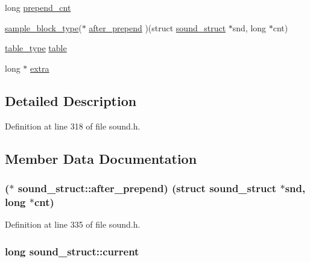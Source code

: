 \begin{DoxyCompactItemize}
long \hyperlink{structsound__struct_a253c4a0814605d956f3fccb616ccbe90}{prepend\+\_\+cnt}
\item 
\hyperlink{sound_8h_a6becaef7eb98c0e45b13f72dadf07b23}{sample\+\_\+block\+\_\+type}($\ast$ \hyperlink{structsound__struct_a9c04a2fe9d615fe258d8db15e04adc42}{after\+\_\+prepend} )(struct \hyperlink{structsound__struct}{sound\+\_\+struct} $\ast$snd, long $\ast$cnt)
\item 
\hyperlink{sound_8h_a187b856587310160cfd8b383e7377171}{table\+\_\+type} \hyperlink{structsound__struct_a2f2f797cf14f3038124f9db72182452e}{table}
\item 
long $\ast$ \hyperlink{structsound__struct_a932aa99e359ac71885ffa3426b2353cf}{extra}
\end{DoxyCompactItemize}


\subsection{Detailed Description}


Definition at line 318 of file sound.\+h.



\subsection{Member Data Documentation}
\subsubsection[{\texorpdfstring{after\+\_\+prepend}{after_prepend}}]{($\ast$ sound\+\_\+struct\+::after\+\_\+prepend) (struct {\bf sound\+\_\+struct} $\ast$snd, long $\ast$cnt)}\hypertarget{structsound__struct_a9c04a2fe9d615fe258d8db15e04adc42}{}\label{structsound__struct_a9c04a2fe9d615fe258d8db15e04adc42}


Definition at line 335 of file sound.\+h.

\subsubsection[{\texorpdfstring{current}{current}}]{\setlength{\rightskip}{0pt plus 5cm}long sound\+\_\+struct\+::current}\hypertarget{structsound__struct_a36de08aa7f68cf01c3f197548bc3e00f}{}\label{structsound__struct_a36de08aa7f68cf01c3f197548bc3e00f}



